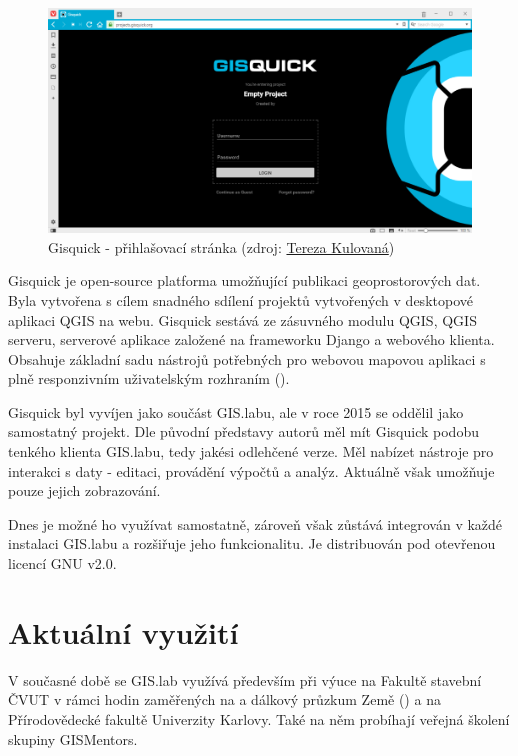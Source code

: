 \begin{figure}[H] \centering
    \includegraphics[width=400pt]{./pictures/gisquick-welcome-screen.png}
    \caption[Gisquick - přihlašovací stránka]{Gisquick - přihlašovací stránka (zdroj:
	\href{}{Tereza Kulovaná})}
    \label{fig:gisquick-welcome}
\end{figure}

Gisquick je open-source platforma umožňující publikaci geoprostorových
dat. Byla vytvořena s cílem snadného sdílení projektů vytvořených v
desktopové aplikaci QGIS na webu. Gisquick sestává ze zásuvného modulu
QGIS, QGIS serveru, serverové aplikace založené na frameworku Django a 
webového klienta. Obsahuje základní sadu nástrojů
potřebných pro webovou mapovou aplikaci s plně responzivním uživatelským
rozhraním ().

Gisquick byl vyvíjen jako součást GIS.labu, ale v roce 2015 se oddělil
jako samostatný projekt. Dle původní představy autorů měl mít Gisquick
podobu tenkého klienta GIS.labu, tedy jakési odlehčené verze. Měl 
nabízet nástroje pro interakci s daty - editaci, provádění výpočtů a analýz.
Aktuálně však umožňuje pouze jejich zobrazování. 

Dnes je možné ho využívat samostatně, zároveň však zůstává integrován 
v každé instalaci GIS.labu a rozšiřuje jeho funkcionalitu. Je distribuován 
pod otevřenou licencí GNU  v2.0.

\section{Aktuální využití}
\label{gislab-vyuziti}

V současné době se GIS.lab využívá především při výuce na Fakultě
stavební ČVUT v rámci hodin zaměřených na  a dálkový průzkum
Země () a na Přírodovědecké fakultě Univerzity Karlovy. Také
na něm probíhají veřejná školení skupiny GISMentors.

